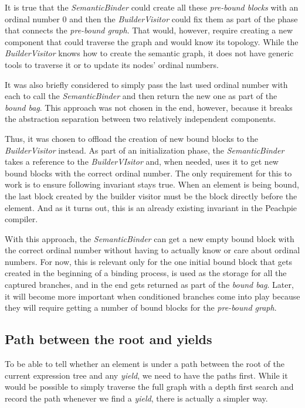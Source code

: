 It is true that the \emph{SemanticBinder} could create all these \emph{pre-bound blocks} with an ordinal number 0 and then the \emph{BuilderVisitor} could fix them as part of the phase that connects the \emph{pre-bound graph}. That would, however, require creating a new component that could traverse the graph and would know its topology. While the \emph{BuilderVisitor} knows how to create the semantic graph, it does not have generic tools to traverse it or to update its nodes’ ordinal numbers.

It was also briefly considered to simply pass the last used ordinal number with each to call the \emph{SemanticBinder} and then return the new one as part of the \emph{bound bag}. This approach was not chosen in the end, however, because it breaks the abstraction separation between two relatively independent components.

Thus, it was chosen to offload the creation of new bound blocks to the \emph{BuilderVisitor} instead. As part of an initialization phase, the \emph{SemanticBinder} takes a reference to the \emph{BuilderVIsitor} and, when needed, uses it to get new bound blocks with the correct ordinal number. The only requirement for this to work is to ensure following invariant stays true. When an element is being bound, the last block created by the builder visitor must be the block directly before the element. And as it turns out, this is an already existing invariant in the Peachpie compiler.

With this approach, the \emph{SemanticBinder} can get a new empty bound block with the correct ordinal number without having to actually know or care about ordinal numbers. For now, this is relevant only for the one initial bound block that gets created in the beginning of a binding process, is used as the storage for all the captured branches, and in the end gets returned as part of the \emph{bound bag}. Later, it will become more important when conditioned branches come into play because they will require getting a number of bound blocks for the \emph{pre-bound graph}.

\subsection{Path between the root and yields}

To be able to tell whether an element is under a path between the root of the current expression tree and any \emph{yield}, we need to have the paths first. While it would be possible to simply traverse the full graph with a depth first search and record the path whenever we find a \emph{yield}, there is actually a simpler way. 

